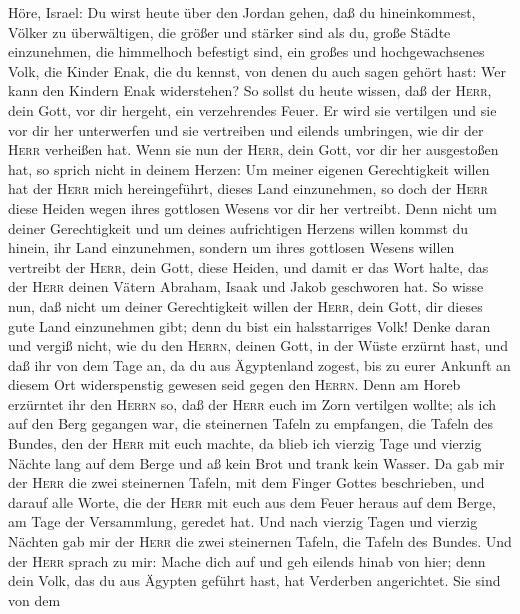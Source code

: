  Höre, Israel: Du wirst heute über den Jordan gehen, daß
du hineinkommest, Völker zu überwältigen, die größer und stärker sind
als du, große Städte einzunehmen, die himmelhoch befestigt sind,
 ein großes und hochgewachsenes Volk, die Kinder Enak, die
du kennst, von denen du auch sagen gehört hast: Wer kann den Kindern
Enak widerstehen?  So sollst du heute wissen, daß der
\textsc{Herr}, dein Gott, vor dir hergeht, ein verzehrendes Feuer. Er
wird sie vertilgen und sie vor dir her unterwerfen und sie vertreiben
und eilends umbringen, wie dir der \textsc{Herr} verheißen hat.
 Wenn sie nun der \textsc{Herr}, dein Gott, vor dir her
ausgestoßen hat, so sprich nicht in deinem Herzen: Um meiner eigenen
Gerechtigkeit willen hat der \textsc{Herr} mich hereingeführt, dieses
Land einzunehmen, so doch der \textsc{Herr} diese Heiden wegen ihres
gottlosen Wesens vor dir her vertreibt.  Denn nicht um
deiner Gerechtigkeit und um deines aufrichtigen Herzens willen kommst du
hinein, ihr Land einzunehmen, sondern um ihres gottlosen Wesens willen
vertreibt der \textsc{Herr}, dein Gott, diese Heiden, und damit er das
Wort halte, das der \textsc{Herr} deinen Vätern Abraham, Isaak und Jakob
geschworen hat.  So wisse nun, daß nicht um deiner
Gerechtigkeit willen der \textsc{Herr}, dein Gott, dir dieses gute Land
einzunehmen gibt; denn du bist ein halsstarriges Volk! 
Denke daran und vergiß nicht, wie du den \textsc{Herrn}, deinen Gott, in
der Wüste erzürnt hast, und daß ihr von dem Tage an, da du aus
Ägyptenland zogest, bis zu eurer Ankunft an diesem Ort widerspenstig
gewesen seid gegen den \textsc{Herrn}.  Denn am Horeb
erzürntet ihr den \textsc{Herrn} so, daß der \textsc{Herr} euch im Zorn
vertilgen wollte;  als ich auf den Berg gegangen war, die
steinernen Tafeln zu empfangen, die Tafeln des Bundes, den der
\textsc{Herr} mit euch machte, da blieb ich vierzig Tage und vierzig
Nächte lang auf dem Berge und aß kein Brot und trank kein Wasser.
 Da gab mir der \textsc{Herr} die zwei steinernen Tafeln,
mit dem Finger Gottes beschrieben, und darauf alle Worte, die der
\textsc{Herr} mit euch aus dem Feuer heraus auf dem Berge, am Tage der
Versammlung, geredet hat.  Und nach vierzig Tagen und
vierzig Nächten gab mir der \textsc{Herr} die zwei steinernen Tafeln,
die Tafeln des Bundes.  Und der \textsc{Herr} sprach zu
mir: Mache dich auf und geh eilends hinab von hier; denn dein Volk, das
du aus Ägypten geführt hast, hat Verderben angerichtet. Sie sind von dem
